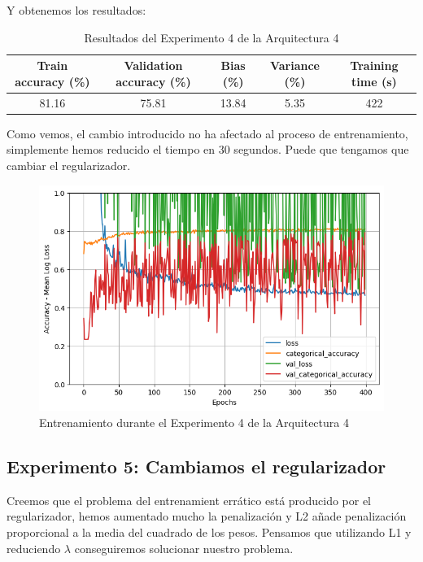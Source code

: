 \documentclass{article}
\begin{document}
			Y obtenemos los resultados:
			\begin{table}[!h]
				\begin{center}
					\begin{tabular}{| c | c | c | c | c |}
						\textbf{Train accuracy (\%)} & \textbf{Validation accuracy (\%)} & \textbf{Bias (\%)} & \textbf{Variance (\%)} & \textbf{Training time (s)} \\ \hline
						81.16 & 75.81 & 13.84 & 5.35 & 422 \\ \hline
					\end{tabular}
					\caption{Resultados del Experimento 4 de la Arquitectura 4}
					\label{tab:res-d-a4-e4}
				\end{center}
			\end{table}
			
			Como vemos, el cambio introducido no ha afectado al proceso de entrenamiento, simplemente hemos reducido el tiempo en 30 segundos. Puede que tengamos que cambiar el regularizador.
			\begin{figure}[!h]
				\begin{center}
					\includegraphics[scale=0.5]{d-tr-a4-e4.png}		
					\caption{Entrenamiento durante el Experimento 4 de la Arquitectura 4}	
					\label{tr-d-a4-e4}
				\end{center}
			\end{figure}
			
		\subsection{Experimento 5: Cambiamos el regularizador}
        \label{d-s-a4-e5}
			Creemos que el problema del entrenamient err\'atico est\'a producido por el regularizador, hemos aumentado mucho la penalizaci\'on y L2 a\~nade penalizaci\'on proporcional a la media del cuadrado de los pesos. Pensamos que utilizando L1 y reduciendo $\lambda$ conseguiremos solucionar nuestro problema.
			
\end{document}
